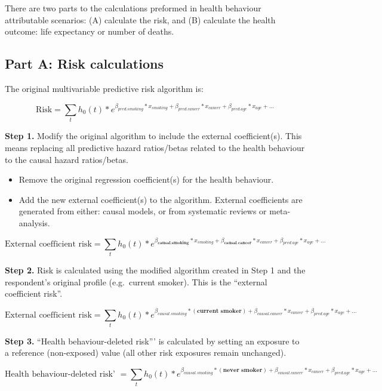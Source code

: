 \documentclass[]{book}
\providecommand{\tightlist}{%
  \setlength{\itemsep}{0pt}\setlength{\parskip}{0pt}}
\begin{document}
There are two parts to the calculations preformed in health behaviour
attributable scenarios: (A) calculate the risk, and (B) calculate the
health outcome: life expectancy or number of deaths.

\subsection{Part A: Risk calculations}\label{part-a-risk-calculations}

The original multivariable predictive risk algorithm is:

\[ \text{Risk} = \sum_t h_0(t) * e^{\beta_{pred.smoking}*x_{smoking}+\beta_{pred.cancer}*x_{cancer} + \beta_{pred.age}*x_{age} +...}  \]

\textbf{Step 1.} Modify the original algorithm to include the external
coefficient(s). This means replacing all predictive hazard ratios/betas
related to the health behaviour to the causal hazard ratios/betas.

\begin{itemize}
\tightlist
\item
  Remove the original regression coefficient(s) for the health
  behaviour.
\item
  Add the new external coefficient(s) to the algorithm. External
  coefficients are generated from either: causal models, or from
  systematic reviews or meta-analysis.
\end{itemize}

\[ \text{External coefficient risk} = \sum_t h_0(t) * e^{{\beta_\textbf{causal.smoking}}*x_{smoking} + {{\beta_\textbf{causal.cancer}}}*x_{cancer} + \beta_{pred.age}*x_{age} +...}  \]

\textbf{Step 2.} Risk is calculated using the modified algorithm created
in Step 1 and the respondent's original profile (e.g.~current smoker).
This is the ``external coefficient risk''.

\[ \text{External coefficient risk} = \sum_t h_0(t) * e^{\beta_{causal.smoking}* {(\textbf{current smoker})} + \beta_{causal.cancer}*x_{cancer} + \beta_{pred.age}*x_{age} +...}  \]

\textbf{Step 3.} ``Health behaviour-deleted risk''' is calculated by
setting an exposure to a reference (non-exposed) value (all other risk
exposures remain unchanged).

\[ \text{Health behaviour-deleted risk' } = \sum_t h_0(t) * e^{\beta_{causal.smoking}* {(\textbf{never smoker})} + \beta_{causal.cancer}*x_{cancer} + \beta_{pred.age}*x_{age} +...}  \]
\end{document}
